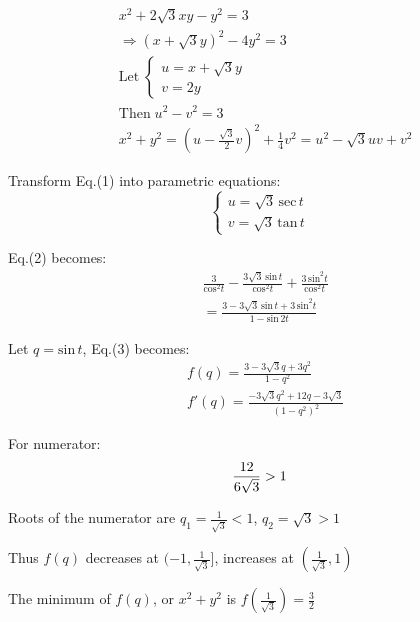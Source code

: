 \documentclass[12pt,a4paper,fleqn]{article}
\begin{document}
\large
\begin{align*}
& x^2+2\sqrt{3}xy-y^2=3 \\
& \Rightarrow (x+\sqrt{3}y)^2-4y^2=3 \\
& {\mathrm{Let}}\; \begin{cases}
	u=x+\sqrt{3}y \\
	v=2y
	\end{cases} \\
& {\mathrm{Then}}\; u^2-v^2=3 \tag{1} \\
& x^2+y^2=(u-\frac{\sqrt{3}}{2}v)^2+\frac{1}{4}v^2=u^2-\sqrt{3}uv+v^2 \tag{2}
\end{align*}

Transform Eq.(1) into parametric equations:
\begin{equation*}
\begin{cases}
	u=\sqrt{3}\,{\mathrm{sec}}\,t \\
	v=\sqrt{3}\,{\mathrm{tan}}\,t
\end{cases}
\end{equation*}

Eq.(2) becomes: \\
\begin{align*}
& \frac{3}{{\mathrm{cos}}^2t}-\frac{3\sqrt{3}\,{\mathrm{sin}}\,t}{{\mathrm{cos}}^2t}+\frac{3\,{\mathrm{sin}}^2t}{{\mathrm{cos}}^2t} \\
& =\frac{3-3\sqrt{3}\,{\mathrm{sin}}\,t+3\,{\mathrm{sin}}^2t}{1-{\mathrm{sin}}\,2t} \tag{3}
\end{align*}

Let $q={\mathrm{sin}}\,t$, Eq.(3)\; becomes:
\begin{align*}
& f(q)=\frac{3-3\sqrt{3}q+3q^2}{1-q^2} \\
& f'(q)=\frac{-3\sqrt{3}q^2+12q-3\sqrt{3}}{(1-q^2)^2}
\end{align*}

For numerator:
\begin{equation*}
\frac{12}{6\sqrt{3}}>1 \\
\end{equation*}

Roots of the numerator are $q_1=\frac{1}{\sqrt{3}}<1$, $q_2=\sqrt{3}>1$

Thus $f(q)$ decreases at $(-1,\frac{1}{\sqrt{3}}]$, increases at $(\frac{1}{\sqrt{3}},1)$

The minimum of $f(q)$, or $x^2+y^2$ is $f(\frac{1}{\sqrt{3}})=\frac{3}{2}$
	
\end{document}
